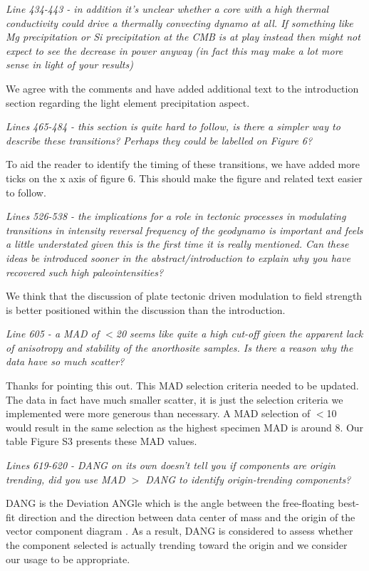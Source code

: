 \documentclass[11pt, letterpaper]{article}
\begin{document}
\begin{flushleft}
\textit{Line 434-443 - in addition it's unclear whether a core with a high thermal conductivity could drive a thermally convecting dynamo at all. If something like Mg precipitation or Si precipitation at the CMB is at play instead then might not expect to see the decrease in power anyway (in fact this may make a lot more sense in light of your results)}

We agree with the comments and have added additional text to the introduction section regarding the light element precipitation aspect. 

\textit{Lines 465-484 - this section is quite hard to follow, is there a simpler way to describe these transitions? Perhaps they could be labelled on Figure 6?}

To aid the reader to identify the timing of these transitions, we have added more ticks on the x axis of figure 6. This should make the figure and related text easier to follow.  

\textit{Lines 526-538 - the implications for a role in tectonic processes in modulating transitions in intensity\/ reversal frequency of the geodynamo is important and feels a little understated given this is the first time it is really mentioned. Can these ideas be introduced sooner in the abstract/introduction to explain why you have recovered such high paleointensities?}

We think that the discussion of plate tectonic driven modulation to field strength is better positioned within the discussion than the introduction. 

\textit{Line 605 - a MAD of $<$20 seems like quite a high cut-off given the apparent lack of anisotropy and stability of the anorthosite samples. Is there a reason why the data have so much scatter?}

Thanks for pointing this out. This MAD selection criteria needed to be updated. The data in fact have much smaller scatter, it is just the selection criteria we implemented were more generous than necessary. A MAD selection of $<$10 would result in the same selection as the highest specimen MAD is around 8. Our table Figure S3 presents these MAD values. 

\textit{Lines 619-620 - DANG on its own doesn't tell you if components are origin trending, did you use MAD $>$ DANG to identify origin-trending components?}

DANG is the Deviation ANGle which is the angle between the free-floating best-fit direction and the direction between data center of mass and the origin of the vector component diagram  \cite{Tauxe2004a}. As a result, DANG is considered to assess whether the component selected is actually trending toward the origin and we consider our usage to be appropriate. 


\end{flushleft}
\end{document}
